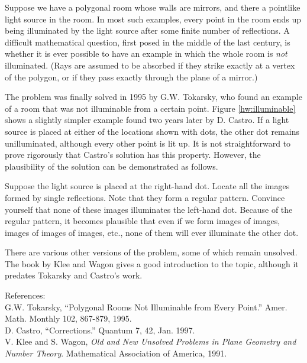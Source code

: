 Suppose we have a polygonal room whose walls are mirrors, and there a pointlike
light source in the room. In most such examples, every point in the room ends up
being illuminated by the light source after some finite number of reflections.
A difficult mathematical question, first posed in the middle of the last century,
is whether it is ever possible to have an example in which the whole room is
\emph{not} illuminated. (Rays are assumed to be absorbed if they strike exactly at a vertex of the polygon,
or if they pass exactly through the plane of a mirror.)

The problem was finally solved in 1995 by G.W. Tokarsky,
who found an example of a room that was not illuminable from a certain point.
Figure \ref{hw:illuminable} shows a slightly simpler example found two years later
by D. Castro. If a light source is placed at either of the locations shown with
dots, the other dot remains unilluminated, although every other point is lit up.
It is not straightforward to prove rigorously that Castro's solution has this property.
However, the plausibility of the solution can be demonstrated as follows.

Suppose the light source is placed at the right-hand dot. Locate all the images
formed by single reflections. Note that they form a regular pattern. Convince yourself
that none of these images illuminates the left-hand dot. Because of the regular
pattern, it becomes plausible that even if we form images of images, images of images
of images, etc., none of them will ever illuminate the other dot.

There are various other versions of the problem, some of which remain unsolved.
The book by Klee and Wagon gives a good introduction to the topic, although it
predates Tokarsky and Castro's work.

References:\\
G.W. Tokarsky, ``Polygonal Rooms Not Illuminable from Every Point.'' Amer. Math. Monthly 102, 867-879, 1995. \\
D. Castro, ``Corrections.'' Quantum 7, 42, Jan. 1997.\\
V. Klee and S. Wagon, \emph{Old and New Unsolved Problems in Plane Geometry and Number Theory}. Mathematical
Association of America, 1991.
